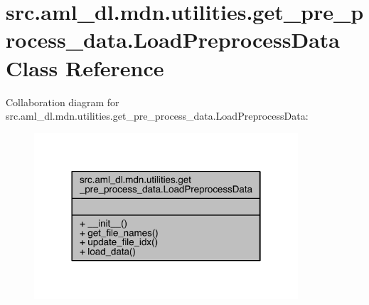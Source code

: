 \hypertarget{classsrc_1_1aml__dl_1_1mdn_1_1utilities_1_1get__pre__process__data_1_1_load_preprocess_data}{}\section{src.\+aml\+\_\+dl.\+mdn.\+utilities.\+get\+\_\+pre\+\_\+process\+\_\+data.\+Load\+Preprocess\+Data Class Reference}
\label{classsrc_1_1aml__dl_1_1mdn_1_1utilities_1_1get__pre__process__data_1_1_load_preprocess_data}


Collaboration diagram for src.\+aml\+\_\+dl.\+mdn.\+utilities.\+get\+\_\+pre\+\_\+process\+\_\+data.\+Load\+Preprocess\+Data\+:
\nopagebreak
\begin{figure}[H]
\begin{center}
\leavevmode
\includegraphics[width=278pt]{classsrc_1_1aml__dl_1_1mdn_1_1utilities_1_1get__pre__process__data_1_1_load_preprocess_data__coll__graph}
\end{center}
\end{figure}
